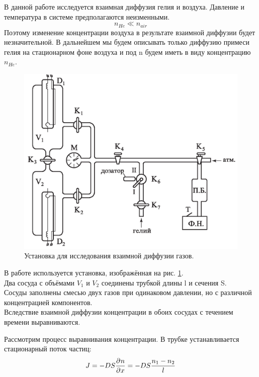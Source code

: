 \documentclass[a4paper,12pt]{article}
\numberwithin{equation}{section}
\begin{document}
В данной работе исследуется взаимная диффузия гелия и воздуха. Давление и температура в системе предполагаются неизменными.\\
\[n_{He} \ll n_{air}\]
Поэтому изменение концентрации воздуха в результате взаимной диффузии будет незначительной. В дальнейшем мы будем описывать только диффузию примеси
гелия на стационарном фоне воздуха и под n будем иметь в виду концентрацию $n_{He}$. \par

\begin{figure}[H]
  \centering
  \includegraphics[scale=0.5]{data/fig1.png}
  \caption[Установка.]{Установка для исследования взаимной диффузии газов.}
  \label{fig:1}
\end{figure}

В работе используется установка, изображённая на рис. \ref{fig:1}. \\
Два сосуда с объёмами $V_1$ и $V_2$ соединены трубкой длины l и сечения S. \\
Сосуды заполнены смесью двух газов при одинаковом давлении, но с различной концентрацией компонентов. \\
Вследствие взаимной диффузии концентрации в обоих сосудах с течением времени выравниваются. \par
Рассмотрим процесс выравнивания концентрации. В трубке устанавливается стационарный поток частиц:
\begin{equation}
  J = -DS \partderiv{n}{x} = -DS \frac{n_1 - n_2}{l}
\end{equation}
\end{document}

